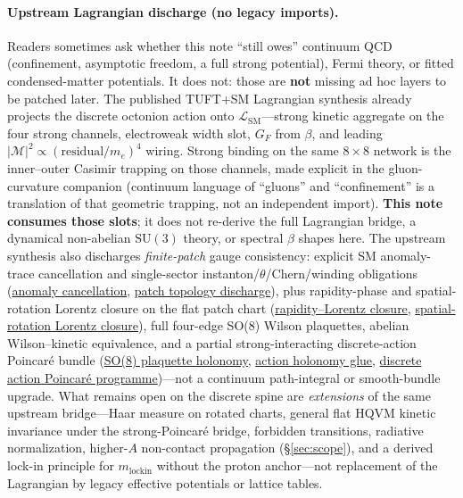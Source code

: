 \documentclass[11pt,notitlepage]{amsart}
\begin{document}
\paragraph{Upstream Lagrangian discharge (no legacy imports).}
Readers sometimes ask whether this note ``still owes'' continuum QCD (confinement,
asymptotic freedom, a full strong potential), Fermi theory, or fitted condensed-matter
potentials. It does not: those are \textbf{not} missing ad hoc layers to be patched later.
The published TUFT+SM Lagrangian synthesis
\cite{hqiv-tuft-sm-lagrangian-paper} already projects the discrete octonion action onto
$\mathcal{L}_{\mathrm{SM}}$---strong kinetic aggregate on the four strong channels,
electroweak width slot, $G_F$ from $\beta$, and leading
$|\mathcal{M}|^2\propto(\mathrm{residual}/m_e)^4$ wiring. Strong binding on the same
$8\times8$ network is the inner--outer Casimir trapping on those channels, made explicit
in the gluon-curvature companion \cite{hqiv-gluon-curvature-note} (continuum language of
``gluons'' and ``confinement'' is a translation of that geometric trapping, not an
independent import). \textbf{This note consumes those slots}; it does not re-derive the
full Lagrangian bridge, a dynamical non-abelian $\mathrm{SU}(3)$ theory, or spectral
$\beta$ shapes here. The upstream synthesis also discharges \emph{finite-patch} gauge
consistency: explicit SM anomaly-trace cancellation and single-sector instanton/$\theta$/Chern/winding
obligations (\hyperref[lean:anomaly-cancellation]{anomaly cancellation},
\hyperref[lean:patch-topology-discharge]{patch topology discharge}),
plus rapidity-phase and spatial-rotation Lorentz closure on the flat patch chart
(\hyperref[lean:rapidity-lorentz-closure]{rapidity--Lorentz closure},
\hyperref[lean:spatial-rotation-lorentz-closure]{spatial-rotation Lorentz closure}),
full four-edge SO(8) Wilson plaquettes, abelian Wilson--kinetic equivalence, and a partial
strong-interacting discrete-action Poincaré bundle
(\hyperref[lean:so8-plaquette]{SO(8) plaquette holonomy},
\hyperref[lean:action-holonomy-glue]{action holonomy glue},
\hyperref[lean:discrete-action-poincare]{discrete action Poincaré programme})---not a continuum path-integral or
smooth-bundle upgrade. What remains open on the discrete spine are
\emph{extensions} of the same upstream bridge---Haar measure on rotated charts, general
flat HQVM kinetic invariance under the strong-Poincaré bridge, forbidden transitions, radiative normalization,
higher-$A$ non-contact propagation (\S\ref{sec:scope}), and a derived lock-in principle for
$m_{\mathrm{lockin}}$ without the proton anchor---not replacement of the Lagrangian by
legacy effective potentials or lattice tables.
\end{document}
